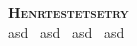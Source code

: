 \documentclass[letterpaper,11pt]{article}
\begin{document}
\begin{center}
    \textbf{\Huge \scshape Henrtestetsetry} \\ \vspace{1pt}
    \small
            asd
         \textbar\ 
            asd
         \textbar\ 
            asd
         \textbar\ 
            asd
         \textbar\ 
\end{center}


\end{document}
